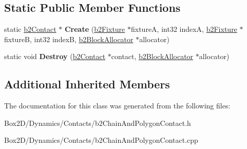 \subsection*{Static Public Member Functions}
\begin{DoxyCompactItemize}
\item 
\mbox{\label{classb2_chain_and_polygon_contact_a03e9021485104ae8f485f986703fcd85}} 
static \hyperlink{classb2_contact}{b2\+Contact} $\ast$ {\bfseries Create} (\hyperlink{classb2_fixture}{b2\+Fixture} $\ast$fixtureA, int32 indexA, \hyperlink{classb2_fixture}{b2\+Fixture} $\ast$fixtureB, int32 indexB, \hyperlink{classb2_block_allocator}{b2\+Block\+Allocator} $\ast$allocator)
\item 
\mbox{\label{classb2_chain_and_polygon_contact_aa31bf71d64dd78583505b6da76ef289c}} 
static void {\bfseries Destroy} (\hyperlink{classb2_contact}{b2\+Contact} $\ast$contact, \hyperlink{classb2_block_allocator}{b2\+Block\+Allocator} $\ast$allocator)
\end{DoxyCompactItemize}
\subsection*{Additional Inherited Members}


The documentation for this class was generated from the following files\+:\begin{DoxyCompactItemize}
\item 
Box2\+D/\+Dynamics/\+Contacts/b2\+Chain\+And\+Polygon\+Contact.\+h\item 
Box2\+D/\+Dynamics/\+Contacts/b2\+Chain\+And\+Polygon\+Contact.\+cpp\end{DoxyCompactItemize}
